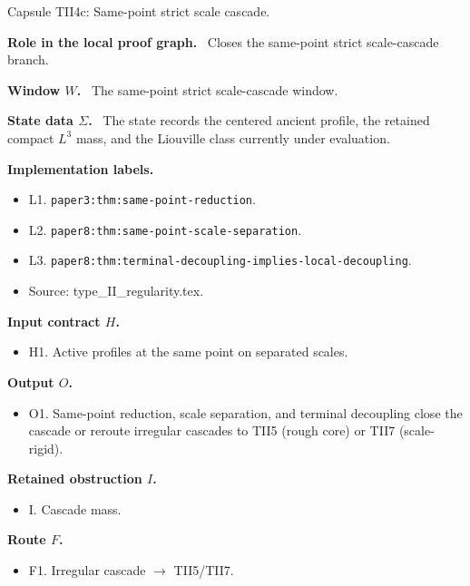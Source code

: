 \documentclass[11pt]{amsart}
\newcommand{\capsulefield}[1]{\par\smallskip\noindent\textbf{#1.}\ }
\begin{document}
\begin{proofcapsule}{Capsule TII4c: Same-point strict scale cascade.}
  \capsulefield{Role in the local proof graph}
  Closes the same-point strict scale-cascade branch.

  \capsulefield{Window \(W\)}
The same-point strict scale-cascade window.

  \capsulefield{State data \(\Sigma\)}
The state records the centered ancient profile, the retained compact $L^3$ mass, and the Liouville class currently under evaluation.

  \capsulefield{Implementation labels}
  \begin{itemize}[leftmargin=1.8em]
  \item L1. \texttt{paper3:thm:same-point-reduction}.
  \item L2. \texttt{paper8:thm:same-point-scale-separation}.
  \item L3. \texttt{paper8:thm:terminal-decoupling-implies-local-decoupling}.
  \item Source: type\_II\_regularity.tex.
  \end{itemize}

  \capsulefield{Input contract \(H\)}
  \begin{itemize}[leftmargin=1.8em]
  \item H1. Active profiles at the same point on separated scales.
  \end{itemize}

  \capsulefield{Output \(O\)}
  \begin{itemize}[leftmargin=1.8em]
  \item O1. Same-point reduction, scale separation, and terminal decoupling close the cascade or reroute irregular cascades to TII5 (rough core) or TII7 (scale-rigid).
  \end{itemize}

  \capsulefield{Retained obstruction \(I\)}
  \begin{itemize}[leftmargin=1.8em]
  \item I. Cascade mass.
  \end{itemize}

  \capsulefield{Route \(F\)}
  \begin{itemize}[leftmargin=1.8em]
  \item F1. Irregular cascade $\to$ TII5/TII7.
  \end{itemize}


\end{proofcapsule}
\end{document}
